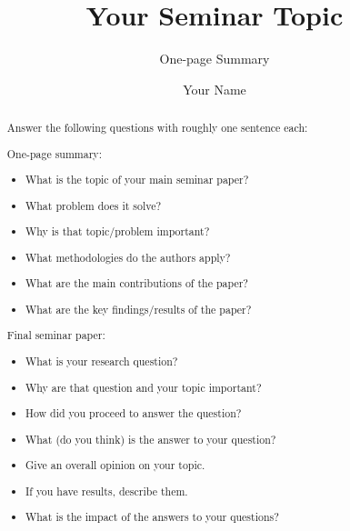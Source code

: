 \documentclass[sigconf]{acmart}
\begin{document}
\title{Your Seminar Topic}

\subtitle{One-page Summary}



\author{Your Name}

\renewcommand{\shortauthors}{Y. Name et al.}


\begin{abstract}
  Answer the following questions with roughly one sentence each:

  One-page summary:
  \begin{itemize}
  \item What is the topic of your main seminar paper?
  \item What problem does it solve?
  \item Why is that topic/problem important?
  \item What methodologies do the authors apply?
  \item What are the main contributions of the paper?
  \item What are the key findings/results of the paper?
  \end{itemize}
  
  Final seminar paper:
  \begin{itemize}
  \item What is your research question?
  \item Why are that question and your topic important?
  \item How did you proceed to answer the question?
  \item What (do you think) is the answer to your question?
  \item Give an overall opinion on your topic.
  \item If you have results, describe them.
  \item What is the impact of the answers to your questions?
  \end{itemize}

\end{abstract}
\end{document}
